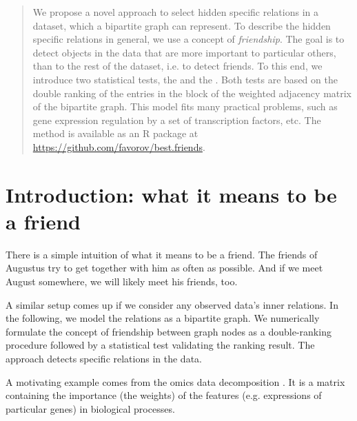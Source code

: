 \documentclass{llncs}
\begin{document}
\begin{abstract}
We propose a novel approach to select hidden specific relations in a dataset, which a bipartite graph can represent. 
To describe the hidden specific relations in general, we use a concept of \textit{friendship}. The goal is to detect objects in the data that are more important to particular others, than to the rest of the dataset, i.e. to detect friends. To this end, we introduce two statistical tests, the  and the . Both tests are based on the double ranking of the entries in the block of the weighted adjacency matrix of the bipartite graph. This model fits many practical problems, such as gene expression regulation by a set of transcription factors, etc. The method is available as an \textsf{R} package at \url{https://github.com/favorov/best.friends}.
\end{abstract}



\section{Introduction: what it means to be a friend}

There is a simple intuition of what it means to be a friend.  
The friends of Augustus try to get together with him as often as possible. And if we meet August somewhere, we will likely meet his friends, too.

A similar setup comes up if we consider any observed data's inner relations. 
In the following, we model the relations as a bipartite graph. We numerically formulate the concept of friendship between graph nodes as a double-ranking procedure followed by a statistical test validating the ranking result. The approach detects specific relations in the data.


A motivating example comes from the omics data decomposition \cite{fertig_cogaps_2010, stein-obrien_enter_2018}. It is a matrix containing the importance (the weights) of the features (e.g. expressions of particular genes) in biological processes.
\end{document}
